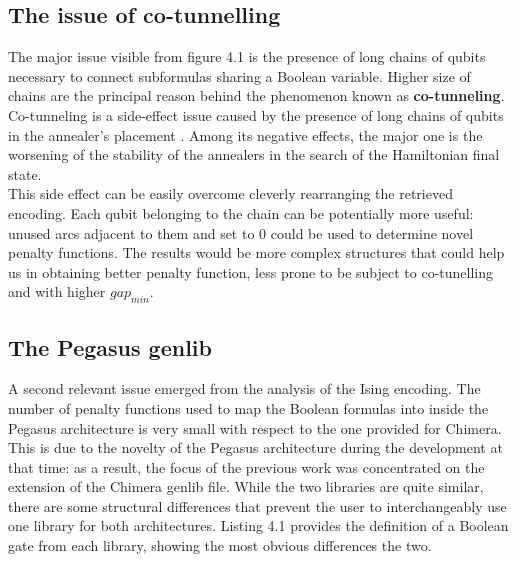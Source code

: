 \subsection{The issue of co-tunnelling}

The major issue visible from figure 4.1 is the presence of long chains of qubits necessary to connect subformulas sharing a Boolean variable. Higher size of chains are the principal reason behind the phenomenon known as \textbf{co-tunneling}.  \\
 Co-tunneling is a side-effect issue caused by the presence of long chains of qubits in the annealer's placement \cite{cotunneling}. Among its negative effects, the major one is the worsening of the stability of the annealers in the search of the Hamiltonian final state. \\
 This side effect can be easily overcome cleverly rearranging the retrieved encoding. Each qubit belonging to the chain can be potentially more useful: unused arcs adjacent to them and set to 0 could be used to determine novel penalty functions. The results would be more complex structures that could help us in obtaining better penalty function, less prone to be subject to co-tunelling and with higher $gap_{min}$.
 
 \subsection{The Pegasus genlib}
 
 A second relevant issue emerged from the analysis of the Ising encoding. The number of penalty functions used to map the Boolean formulas into inside the Pegasus architecture is very small with respect to the one provided for Chimera. This is due to the novelty of the Pegasus architecture during the development at that time: as a result, the focus of the previous work was concentrated on the extension of the Chimera genlib file. While the two libraries are quite similar, there are some structural differences that prevent the user to interchangeably use one library for both architectures. Listing 4.1 provides the definition of a Boolean gate from each library, showing the most obvious differences the two. \\
 
